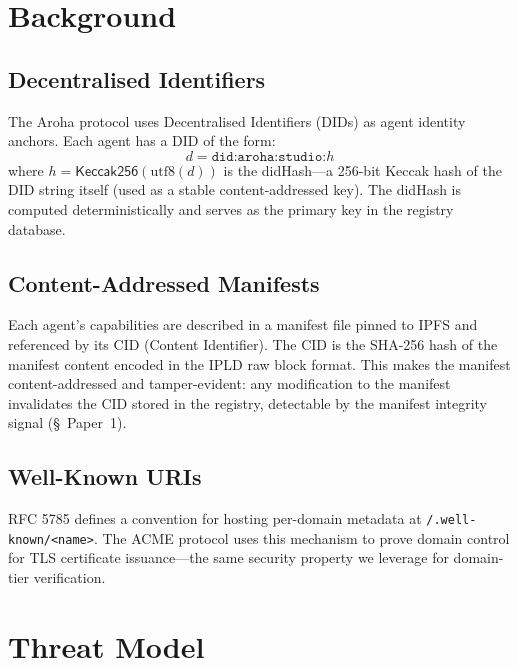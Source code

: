 \documentclass[conference]{IEEEtran}
\begin{document}
\section{Background}
\label{sec:background}

\subsection{Decentralised Identifiers}

The Aroha protocol uses Decentralised Identifiers (DIDs)
\cite{w3c2022did} as agent identity anchors.  Each agent
has a DID of the form:
\begin{equation}
  d = \texttt{did:aroha:studio:}h
  \label{eq:did}
\end{equation}
where $h = \mathsf{Keccak256}(\text{utf8}(d))$ is the
didHash—a 256-bit Keccak hash \cite{keccak2015} of the DID
string itself (used as a stable content-addressed key).
The didHash is computed deterministically and serves as the
primary key in the registry database.

\subsection{Content-Addressed Manifests}

Each agent's capabilities are described in a manifest file
pinned to IPFS \cite{ipfs2014whitepaper} and referenced by
its CID (Content Identifier).  The CID is the SHA-256 hash
of the manifest content encoded in the IPLD raw block
format.  This makes the manifest content-addressed and
tamper-evident: any modification to the manifest invalidates
the CID stored in the registry, detectable by the manifest
integrity signal (\S~Paper~1).

\subsection{Well-Known URIs}

RFC 5785 \cite{rfc5785} defines a convention for hosting
per-domain metadata at \texttt{/.well-known/<name>}. The
ACME protocol \cite{acme2019rfc} uses this mechanism to
prove domain control for TLS certificate issuance—the same
security property we leverage for domain-tier verification.

\section{Threat Model}
\label{sec:threat}
\end{document}
